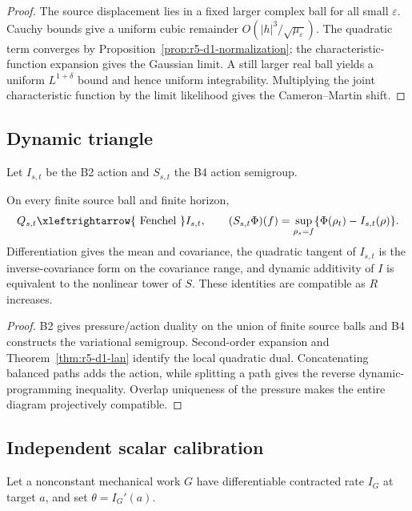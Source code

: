 \begin{proof}
The source displacement lies in a fixed larger complex ball for all small
\(\varepsilon\).  Cauchy bounds give a uniform cubic remainder
\(O(|h|^3/\sqrt{\mu_\varepsilon})\).  The quadratic term converges by
Proposition~\ref{prop:r5-d1-normalization}; the characteristic-function
expansion gives the Gaussian limit.  A still larger real ball yields a
uniform \(L^{1+\delta}\) bound and hence uniform integrability.  Multiplying
the joint characteristic function by the limit likelihood gives the
Cameron--Martin shift.
\end{proof}

\subsection{Dynamic triangle}

Let \(I_{s,t}\) be the B2 action and \(S_{s,t}\) the B4 action semigroup.

\begin{theorem}
\label{thm:r5-d1-triangle}
On every finite source ball and finite horizon,
\[
 Q_{s,t}\xleftrightarrow{\ \mathrm{Fenchel}\ }I_{s,t},
 \qquad
 (S_{s,t}\Phi)(f)
 =\sup_{\rho_s=f}\{\Phi(\rho_t)-I_{s,t}(\rho)\}.
\]
Differentiation gives the mean and covariance, the quadratic tangent of
\(I_{s,t}\) is the inverse-covariance form on the covariance range, and
dynamic additivity of \(I\) is equivalent to the nonlinear tower of \(S\).
These identities are compatible as \(R\) increases.
\end{theorem}

\begin{proof}
B2 gives pressure/action duality on the union of finite source balls and B4
constructs the variational semigroup.  Second-order expansion and
Theorem~\ref{thm:r5-d1-lan} identify the local quadratic dual.  Concatenating
balanced paths adds the action, while splitting a path gives the reverse
dynamic-programming inequality.  Overlap uniqueness of the pressure makes
the entire diagram projectively compatible.
\end{proof}

\subsection{Independent scalar calibration}

Let a nonconstant mechanical work \(G\) have differentiable contracted rate
\(I_G\) at target \(a\), and set \(\theta=I_G'(a)\).

